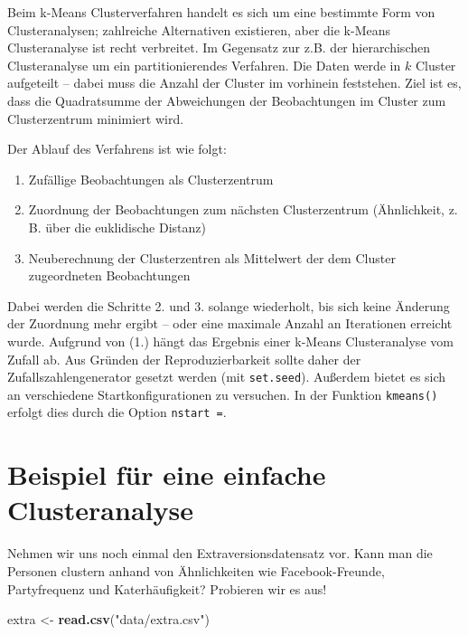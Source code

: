 \documentclass[12pt,ngerman,]{book}
\makeatletter
\newenvironment{Shaded}{\begin{snugshade}}{\end{snugshade}}
\newcommand{\KeywordTok}[1]{\textcolor[rgb]{0.13,0.29,0.53}{\textbf{#1}}}
\newcommand{\StringTok}[1]{\textcolor[rgb]{0.31,0.60,0.02}{#1}}
\newcommand{\NormalTok}[1]{#1}
\providecommand{\tightlist}{%
  \setlength{\itemsep}{0pt}\setlength{\parskip}{0pt}}
\newenvironment{kframe}{%
\medskip{}
\setlength{\fboxsep}{.8em}
 \def\at@end@of@kframe{}%
 \ifinner\ifhmode%
  \def\at@end@of@kframe{\end{minipage}}%
  \begin{minipage}{\columnwidth}%
 \fi\fi%
 \def\FrameCommand##1{\hskip\@totalleftmargin \hskip-\fboxsep
 \colorbox{shadecolor}{##1}\hskip-\fboxsep
     \hskip-\linewidth \hskip-\@totalleftmargin \hskip\columnwidth}%
 \MakeFramed {\advance\hsize-\width
   \@totalleftmargin\z@ \linewidth\hsize
   \@setminipage}}%
 {\par\unskip\endMakeFramed%
 \at@end@of@kframe}
\renewenvironment{Shaded}{\begin{kframe}}{\end{kframe}}
\theoremstyle{definition}
\theoremstyle{definition}
\theoremstyle{remark}
\makeatother
\begin{document}
Beim k-Means Clusterverfahren handelt es sich um eine bestimmte Form von
Clusteranalysen; zahlreiche Alternativen existieren, aber die k-Means
Clusteranalyse ist recht verbreitet. Im Gegensatz zur z.B. der
hierarchischen Clusteranalyse um ein partitionierendes Verfahren. Die
Daten werde in \(k\) Cluster aufgeteilt -- dabei muss die Anzahl der
Cluster im vorhinein feststehen. Ziel ist es, dass die Quadratsumme der
Abweichungen der Beobachtungen im Cluster zum Clusterzentrum minimiert
wird.

Der Ablauf des Verfahrens ist wie folgt:

\begin{enumerate}
\def\labelenumi{\arabic{enumi}.}
\tightlist
\item
  Zufällige Beobachtungen als Clusterzentrum
\item
  Zuordnung der Beobachtungen zum nächsten Clusterzentrum (Ähnlichkeit,
  z. B. über die euklidische Distanz)
\item
  Neuberechnung der Clusterzentren als Mittelwert der dem Cluster
  zugeordneten Beobachtungen
\end{enumerate}

Dabei werden die Schritte 2. und 3. solange wiederholt, bis sich keine
Änderung der Zuordnung mehr ergibt -- oder eine maximale Anzahl an
Iterationen erreicht wurde. Aufgrund von (1.) hängt das Ergebnis einer
k-Means Clusteranalyse vom Zufall ab. Aus Gründen der Reproduzierbarkeit
sollte daher der Zufallszahlengenerator gesetzt werden (mit
\texttt{set.seed}). Außerdem bietet es sich an verschiedene
Startkonfigurationen zu versuchen. In der Funktion \texttt{kmeans()}
erfolgt dies durch die Option \texttt{nstart\ =}.

\section{Beispiel für eine einfache
Clusteranalyse}\label{beispiel-fur-eine-einfache-clusteranalyse}

Nehmen wir uns noch einmal den Extraversionsdatensatz vor. Kann man die
Personen clustern anhand von Ähnlichkeiten wie Facebook-Freunde,
Partyfrequenz und Katerhäufigkeit? Probieren wir es aus!

\begin{Shaded}
\begin{Highlighting}[]
\NormalTok{extra <-}\StringTok{ }\KeywordTok{read.csv}\NormalTok{(}\StringTok{"data/extra.csv"}\NormalTok{)}
\end{Highlighting}
\end{Shaded}
\end{document}
